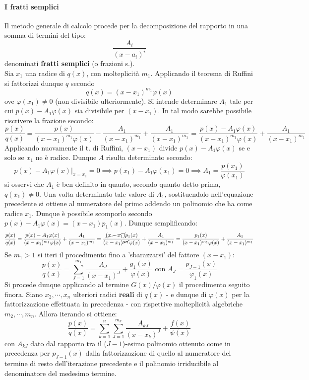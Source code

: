 \documentclass[10pt]{article}
\theoremstyle{plain}
\begin{document}
\paragraph*{I fratti semplici}
 Il metodo generale di calcolo procede per la decomposizione del rapporto in una somma di termini del tipo:
 \[\frac{A_i}{(x - a_i)^i}\]
denominati \textbf{fratti semplici} (o frazioni s.).
\\Sia $x_1$ una radice di $q(x)$, con molteplicità $m_1$. Applicando il teorema di Ruffini si fattorizzi dunque $q$ secondo
\[q(x) = (x - x_1)^{m_1} \varphi(x)\]
ove $\varphi(x_1) \neq 0$ (non divisibile ulteriormente). Si intende determinare $A_1$ tale per cui $p(x) - A_1\varphi(x)$ sia divisibile per $(x-x_1)$. In tal modo sarebbe possibile riscrivere la frazione secondo:
\[\frac{p(x)}{q(x)} = \frac{p(x)}{(x-x_1)^{m_1}\varphi(x)} - \frac{A_1}{(x-x_1)^{m_1}} + \frac{A_1}{(x-x_1)^{m_1}} = \frac{p(x) - A_1\varphi(x)}{(x-x_1)^{m_1}\varphi(x)} + \frac{A_1}{(x-x_1)^{m_1}}\]
Applicando nuovamente il t. di Ruffini, $(x-x_1)$ divide $p(x) - A_1\varphi(x)$ se e solo se $x_1$ ne è radice. Dunque $A$ risulta determinato secondo:
\[p(x) - A_1\varphi(x)\big|_{x = x_1} = 0 \implies p(x_1) - A_1 \varphi(x_1) = 0 \implies A_1 = \frac{p(x_1)}{\varphi(x_1)}\]
si osservi che $A_1$ è ben definito in quanto, secondo quanto detto prima, $q(x_1) \neq 0$. Una volta determinato tale valore di $A_1$, sostituendolo nell'equazione precedente si ottiene al numeratore del primo addendo un polinomio che ha come radice $x_1$. Dunque è possibile scomporlo secondo $p(x) - A_1\varphi(x) = (x - x_1) p_1(x)$. Dunque semplificando:
\[\frac{p(x)}{q(x)} = \frac{p(x) - A_1\varphi(x)}{(x-x_1)^{m_1}\varphi(x)} + \frac{A_1}{(x-x_1)^{m_1}} = \frac{\cancel{(x - x_1)} p_1(x)}{(x-x_1)^{\cancel{m_1}}\varphi(x)} + \frac{A_1}{(x-x_1)^{m_1}} = \frac{p_1(x)}{(x-x_1)^{m_1}\varphi(x)} + \frac{A_1}{(x - x_1)^{m_1}}\]
Se $m_1 > 1$ si iteri il procedimento fino a 'sbarazzarsi' del fattore $(x-x_1)$:
\[\frac{p(x)}{q(x)} = \sum \limits_{J = 1}^{m_1}\frac{A_J}{(x-x_1)^J} + \frac{g_1(x)}{\varphi(x)} \textrm{ con } A_J = \frac{p_{J - 1}(x)}{\varphi_1(x)}\]
Si procede dunque applicando al termine $G(x)/\varphi(x)$ il procedimento seguito finora. Siano $x_2, \cdots , x_n$ ulteriori radici \textbf{reali} di $q(x)$ - e dunque di $\varphi(x)$ per la fattorizzazione effettuata in precedenza - con rispettive molteplicità algebriche $m_2, \cdots, m_n$. Allora iterando si ottiene:
\[\frac{p(x)}{q(x)} = \sum \limits_{k = 1}^n \sum \limits_{J = 1}^{m_k}\frac{A_{kJ}}{(x-x_k)^J} + \frac{f(x)}{\psi(x)}\]
con $A_{kJ}$ dato dal rapporto tra il ($J-1$)-esimo polinomio ottenuto come in precedenza per $p_{J-1}(x)$ dalla fattorizzazione di quello al numeratore del termine di resto dell'iterazione precedente e il polinomio irriducibile al denominatore del medesimo termine.
\end{document}
